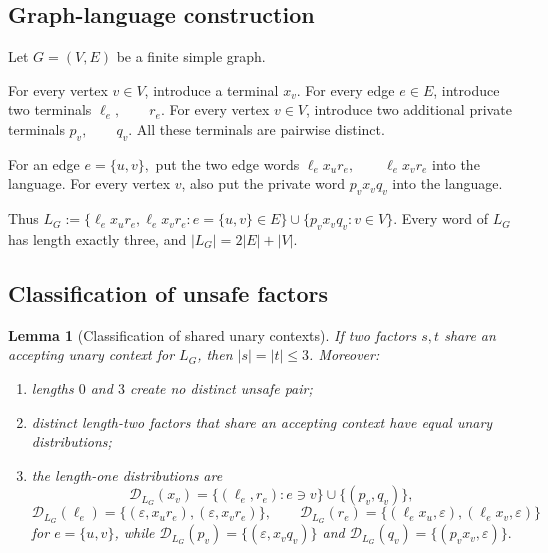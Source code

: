 \documentclass[10pt,a4paper]{article}
\newtheorem{lemma}[theorem]{Lemma}
\theoremstyle{definition}
\theoremstyle{remark}
\newcommand{\D}{\mathcal D}
\begin{document}
\subsection{Graph-language construction}

Let \(G=(V,E)\) be a finite simple graph.

For every vertex \(v\in V\), introduce a terminal \(x_v.\) For every edge \(e\in E\), introduce two terminals \(\ell_e,\qquad r_e.\) For every vertex \(v\in V\), introduce two additional private terminals \(p_v,\qquad q_v.\) All these terminals are pairwise distinct.

For an edge \(e=\{u,v\},\) put the two edge words
\(\ell_e x_u r_e, \qquad \ell_e x_v r_e\)
into the language.
For every vertex \(v\), also put the private word \(p_vx_vq_v\) into the language.

Thus
\(
L_G
:=
\{
\ell_ex_ur_e,\ell_ex_vr_e:
e=\{u,v\}\in E
\}
\cup
\{
p_vx_vq_v:v\in V
\}.
\)
Every word of \(L_G\) has length exactly three, and \(|L_G|=2|E|+|V|.\) 

\subsection{Classification of unsafe factors}

\begin{lemma}[Classification of shared unary contexts]
\label{graph:lem:factor-classification}
If two factors $s,t$ share an accepting unary context for $L_G$, then
$|s|=|t|\le3$.  Moreover:
\begin{enumerate}[label=\textup{(\roman*)},leftmargin=*]
\item lengths $0$ and $3$ create no distinct unsafe pair;
\item distinct length-two factors that share an accepting context have equal
unary distributions;
\item the length-one distributions are
\[
\D_{L_G}(x_v)=\{(\ell_e,r_e):e\ni v\}\cup\{(p_v,q_v)\},
\]
\[
\D_{L_G}(\ell_e)=\{(\varepsilon,x_ur_e),(\varepsilon,x_vr_e)\},
\qquad
\D_{L_G}(r_e)=\{(\ell_ex_u,\varepsilon),(\ell_ex_v,\varepsilon)\}
\]
for $e=\{u,v\}$, while
\(
\D_{L_G}(p_v)=\{(\varepsilon,x_vq_v)\}
\)
and
\(
\D_{L_G}(q_v)=\{(p_vx_v,\varepsilon)\}.
\)
\end{enumerate}
\end{lemma}
\end{document}
